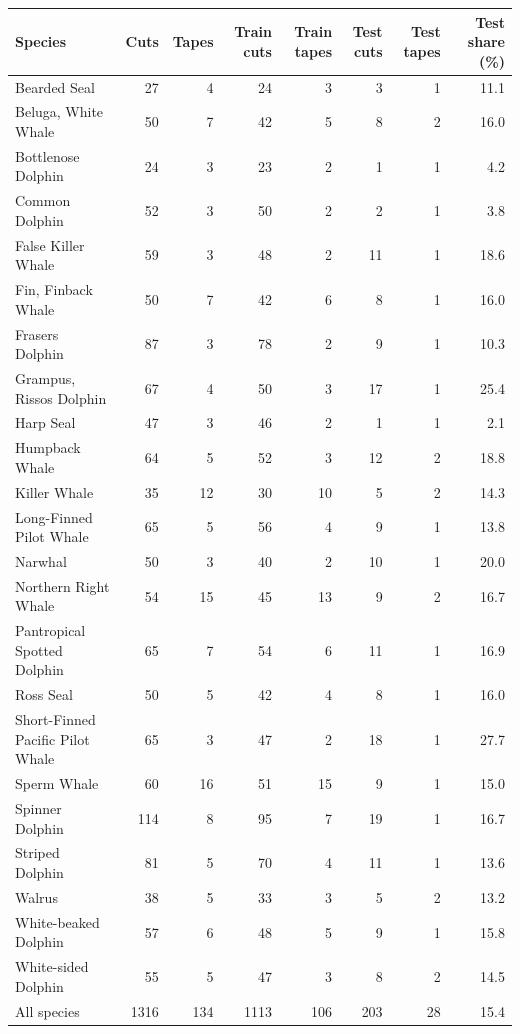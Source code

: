 \begin{tabular}{lrrrrrrr}
\toprule
Species & Cuts & Tapes & Train cuts & Train tapes & Test cuts & Test tapes & Test share (\%) \\
\midrule
Bearded Seal & 27 & 4 & 24 & 3 & 3 & 1 & 11.1 \\
Beluga, White Whale & 50 & 7 & 42 & 5 & 8 & 2 & 16.0 \\
Bottlenose Dolphin & 24 & 3 & 23 & 2 & 1 & 1 & 4.2 \\
Common Dolphin & 52 & 3 & 50 & 2 & 2 & 1 & 3.8 \\
False Killer Whale & 59 & 3 & 48 & 2 & 11 & 1 & 18.6 \\
Fin, Finback Whale & 50 & 7 & 42 & 6 & 8 & 1 & 16.0 \\
Frasers Dolphin & 87 & 3 & 78 & 2 & 9 & 1 & 10.3 \\
Grampus, Rissos Dolphin & 67 & 4 & 50 & 3 & 17 & 1 & 25.4 \\
Harp Seal & 47 & 3 & 46 & 2 & 1 & 1 & 2.1 \\
Humpback Whale & 64 & 5 & 52 & 3 & 12 & 2 & 18.8 \\
Killer Whale & 35 & 12 & 30 & 10 & 5 & 2 & 14.3 \\
Long-Finned Pilot Whale & 65 & 5 & 56 & 4 & 9 & 1 & 13.8 \\
Narwhal & 50 & 3 & 40 & 2 & 10 & 1 & 20.0 \\
Northern Right Whale & 54 & 15 & 45 & 13 & 9 & 2 & 16.7 \\
Pantropical Spotted Dolphin & 65 & 7 & 54 & 6 & 11 & 1 & 16.9 \\
Ross Seal & 50 & 5 & 42 & 4 & 8 & 1 & 16.0 \\
Short-Finned Pacific Pilot Whale & 65 & 3 & 47 & 2 & 18 & 1 & 27.7 \\
Sperm Whale & 60 & 16 & 51 & 15 & 9 & 1 & 15.0 \\
Spinner Dolphin & 114 & 8 & 95 & 7 & 19 & 1 & 16.7 \\
Striped Dolphin & 81 & 5 & 70 & 4 & 11 & 1 & 13.6 \\
Walrus & 38 & 5 & 33 & 3 & 5 & 2 & 13.2 \\
White-beaked Dolphin & 57 & 6 & 48 & 5 & 9 & 1 & 15.8 \\
White-sided Dolphin & 55 & 5 & 47 & 3 & 8 & 2 & 14.5 \\
All species & 1316 & 134 & 1113 & 106 & 203 & 28 & 15.4 \\
\bottomrule
\end{tabular}
